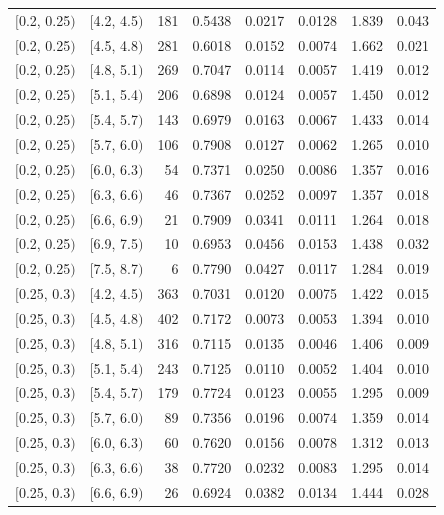 \documentclass[11pt]{article}
\begin{document}
\begin{longtable}{| l | l | r | r | r | r | r | r |}
        $[$0.2, 0.25$)$ & $[$4.2, 4.5$)$ & 181 & 0.5438 & 0.0217 & 0.0128 & 1.839 & 0.043 \\
        $[$0.2, 0.25$)$ & $[$4.5, 4.8$)$ & 281 & 0.6018 & 0.0152 & 0.0074 & 1.662 & 0.021 \\
        $[$0.2, 0.25$)$ & $[$4.8, 5.1$)$ & 269 & 0.7047 & 0.0114 & 0.0057 & 1.419 & 0.012 \\
        $[$0.2, 0.25$)$ & $[$5.1, 5.4$)$ & 206 & 0.6898 & 0.0124 & 0.0057 & 1.450 & 0.012 \\
        $[$0.2, 0.25$)$ & $[$5.4, 5.7$)$ & 143 & 0.6979 & 0.0163 & 0.0067 & 1.433 & 0.014 \\
        $[$0.2, 0.25$)$ & $[$5.7, 6.0$)$ & 106 & 0.7908 & 0.0127 & 0.0062 & 1.265 & 0.010 \\
        $[$0.2, 0.25$)$ & $[$6.0, 6.3$)$ & 54 & 0.7371 & 0.0250 & 0.0086 & 1.357 & 0.016 \\
        $[$0.2, 0.25$)$ & $[$6.3, 6.6$)$ & 46 & 0.7367 & 0.0252 & 0.0097 & 1.357 & 0.018 \\
        $[$0.2, 0.25$)$ & $[$6.6, 6.9$)$ & 21 & 0.7909 & 0.0341 & 0.0111 & 1.264 & 0.018 \\
        $[$0.2, 0.25$)$ & $[$6.9, 7.5$)$ & 10 & 0.6953 & 0.0456 & 0.0153 & 1.438 & 0.032 \\
        $[$0.2, 0.25$)$ & $[$7.5, 8.7$)$ & 6 & 0.7790 & 0.0427 & 0.0117 & 1.284 & 0.019 \\
        $[$0.25, 0.3$)$ & $[$4.2, 4.5$)$ & 363 & 0.7031 & 0.0120 & 0.0075 & 1.422 & 0.015 \\
        $[$0.25, 0.3$)$ & $[$4.5, 4.8$)$ & 402 & 0.7172 & 0.0073 & 0.0053 & 1.394 & 0.010 \\
        $[$0.25, 0.3$)$ & $[$4.8, 5.1$)$ & 316 & 0.7115 & 0.0135 & 0.0046 & 1.406 & 0.009 \\
        $[$0.25, 0.3$)$ & $[$5.1, 5.4$)$ & 243 & 0.7125 & 0.0110 & 0.0052 & 1.404 & 0.010 \\
        $[$0.25, 0.3$)$ & $[$5.4, 5.7$)$ & 179 & 0.7724 & 0.0123 & 0.0055 & 1.295 & 0.009 \\
        $[$0.25, 0.3$)$ & $[$5.7, 6.0$)$ & 89 & 0.7356 & 0.0196 & 0.0074 & 1.359 & 0.014 \\
        $[$0.25, 0.3$)$ & $[$6.0, 6.3$)$ & 60 & 0.7620 & 0.0156 & 0.0078 & 1.312 & 0.013 \\
        $[$0.25, 0.3$)$ & $[$6.3, 6.6$)$ & 38 & 0.7720 & 0.0232 & 0.0083 & 1.295 & 0.014 \\
        $[$0.25, 0.3$)$ & $[$6.6, 6.9$)$ & 26 & 0.6924 & 0.0382 & 0.0134 & 1.444 & 0.028 \\

\end{longtable}
\end{document}
